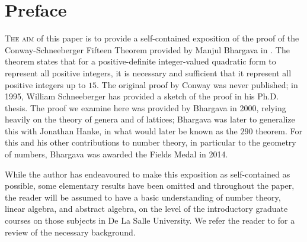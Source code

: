 \chapter*{Preface}

{\scshape The aim} of this paper is to provide a self-contained exposition of the proof of the Conway-Schneeberger Fifteen Theorem provided by Manjul Bhargava in \cite{bhargava2000conway}. The theorem states that for a positive-definite integer-valued quadratic form to represent all positive integers, it is necessary and sufficient that it represent all positive integers up to \(15\). The original proof by Conway was never published; in 1995, William Schneeberger has provided a sketch of the proof in his Ph.D. thesis. \cite{schneeberger1997arithmetic} The proof we examine here was provided by Bhargava in 2000, relying heavily on the theory of genera and of lattices; Bhargava was later to generalize this with Jonathan Hanke, in what would later be known as the \(290\) theorem. \cite{bhargava2005universal} For this and his other contributions to number theory, in particular to the geometry of numbers, Bhargava was awarded the Fields Medal in 2014. \cite{bhargava2014fields}

While the author has endeavoured to make this exposition as self-contained as possible, some elementary results have been omitted and throughout the paper, the reader will be assumed to have a basic understanding of number theory, linear algebra, and abstract algebra, on the level of the introductory graduate courses on those subjects in De La Salle University. We refer the reader to \cite{dudley1978elementary,halmos1942vector,hungerford2012algebra} for a review of the necessary background.

